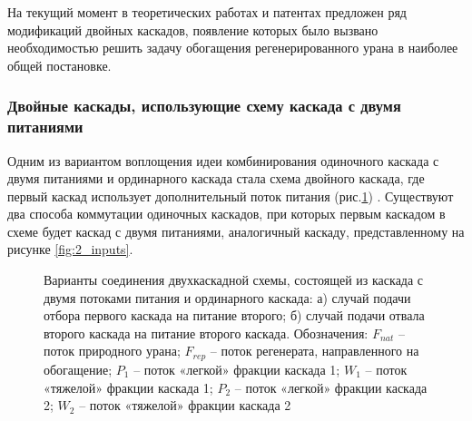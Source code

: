 
На текущий момент в теоретических работах и патентах предложен ряд модификаций двойных каскадов, появление которых было вызвано необходимостью решить задачу обогащения регенерированного урана в наиболее общей постановке. 

\subsubsection{Двойные каскады, использующие схему каскада с двумя питаниями}

Одним из вариантом воплощения идеи комбинирования одиночного каскада с двумя питаниями и ординарного каскада стала схема двойного каскада, где первый каскад использует дополнительный поток питания (рис.\ref{f_2double}) \cite{palkinOchistkaRegenerirovannogoGeksaftorida2013}. Существуют два способа коммутации одиночных каскадов, при которых первым каскадом в схеме будет каскад с двумя питаниями, аналогичный каскаду, представленному на рисунке \ref{fig:2_inputs}.


\begin{figure}[ht]
  \caption{Варианты соединения двухкаскадной схемы, состоящей из каскада с двумя потоками питания и ординарного каскада: а) случай подачи отбора первого каскада на питание второго; б) случай подачи отвала второго каскада на питание второго каскада. Обозначения: $F_{nat}$ – поток природного урана; $F_{rep}$ – поток регенерата, направленного на обогащение; $P_1$ – поток «легкой» фракции каскада 1; $W_1$ – поток «тяжелой» фракции каскада 1; $P_2$ – поток «легкой» фракции каскада 2; $W_2$ – поток «тяжелой» фракции каскада 2}\label{f_2double}
\end{figure}


